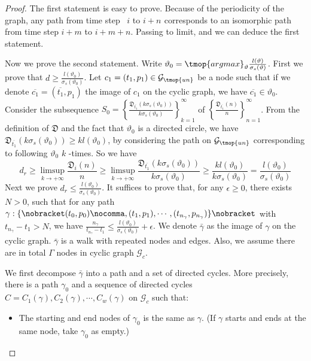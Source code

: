 \begin{proof}
  The first statement is easy to prove. Because of the periodicity of the graph,
  any path from time step \ $i$ to $i + n_{}$ corresponds to an isomorphic
  path from time step $i + m$ to $i + m + n$. Passing to limit, and we can
  deduce the first statement.
  
   Now we prove the second statement. Write $\vartheta_0 =
  \tmop{argmax}_{\vartheta} \frac{l (\vartheta)}{\sigma_s (\vartheta)} $.
  First we prove that $d \geq \frac{l (\vartheta_0)}{\sigma_s (\vartheta_0)}$.
  Let $c_1 = (t_1, p_1) \in \mathcal{G}_{\tmop{un}}$ be a node such that if we
  denote $\overline{c_1} = (\overline{t_1}, p_1)$ the image of $c_1$ on the
  cyclic graph, we have $\overline{c_1} \in \vartheta_0$. Consider the
  subsequence $S_0 = \left\{ \frac{\mathfrak{D}_{\overline{t_1}} (k \sigma_s
  (\vartheta_0))}{k \sigma_s (\vartheta_0)} \right\}_{k = 1}^{\infty}$ of
  $\left\{ \frac{\mathfrak{D}_{\overline{t_1}} (n)}{n} \right\}_{n =
  1}^{\infty}$. From the definition of $\mathfrak{D}$ and the fact that
  $\vartheta_0$ is a directed circle, we have $\mathfrak{D}_{\overline{t_1}}
  (k \sigma_s (\vartheta_0)) \geq k l (\vartheta_0)$, by considering the path
  on $\mathcal{G}_{\tmop{un}}$ corresponding to following $\vartheta_0$ $k$
  -times. So we have
  \[ d_r \geq \limsup_{k \rightarrow + \infty} \frac{\mathfrak{D}_i (n)}{n}
     \geq \limsup_{k \rightarrow + \infty} \frac{\mathfrak{D}_{\overline{t_1}} (k
     \sigma_s (\vartheta_0))}{k \sigma_s (\vartheta_0)} \geq \frac{k l
     (\vartheta_0)}{k \sigma_s (\vartheta_0)} = \frac{l
     (\vartheta_0)}{\sigma_s (\vartheta_0)} \]
  Next we prove $d_r \leq \frac{l (\vartheta_0)}{\sigma_s (\vartheta_0)}$. It
  suffices to prove that, for any $\epsilon \geq 0$, there exists $N > 0$,
  such that for any path $\gamma : \{ \nobracket (t_0, p_0) \nocomma, (t_1,
  p_1), \cdots, (t_{n_{\gamma}}, p_{n_{\gamma}}) \} \nobracket$ with $t_{n_\gamma} -
  t_1 > N$, we have $\frac{n_{\gamma}}{t_{n_\gamma} - t_1} \leq \frac{l
  (\vartheta_0)}{\sigma_s (\vartheta_0)} + \epsilon$. We denote $\bar{\gamma}$
  as the image of $\gamma$ on the cyclic graph. $\bar{\gamma}$ is a walk with
  repeated nodes and edges. Also, we assume there are in total $\Gamma$ nodes
  in cyclic graph $\mathcal{G}_c$.
  
  We first decompose $\bar{\gamma}$ into a path and a set of directed
  cycles. More precisely, there is a path $\gamma_0$ and a sequence of
  directed cycles $C = C_1 (\gamma), C_2 (\gamma), \cdots, C_w (\gamma)$ on
  $\mathcal{G}_c$ such that:
  \begin{itemize}
    \item The starting and end nodes of $\gamma_0$ is the same as $\gamma$.
    (If $\gamma$ starts and ends at the same node, take $\gamma_0$ as empty.)
    

\end{itemize}
\end{proof}

